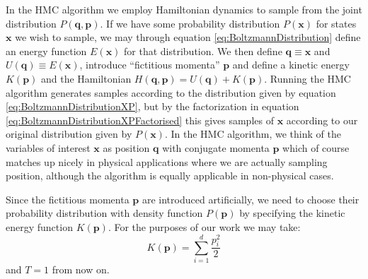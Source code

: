 \documentclass[12pt]{article}
\begin{document}
            In the HMC algorithm we employ Hamiltonian dynamics to sample from the joint distribution $P\left(\bm{q},\bm{p}\right)$. If we have some probability distribution $P\left(\bm{x}\right)$ for states $\bm{x}$ we wish to sample, we may through equation \ref{eq:BoltzmannDistribution} define an energy function $E\left(\bm{x}\right)$ for that distribution. We then define $\bm{q}\equiv\bm{x}$ and $U\left(\bm{q}\right) \equiv E\left(\bm{x}\right)$, introduce ``fictitious momenta'' $\bm{p}$ and define a kinetic energy $K\left(\bm{p}\right)$ and the Hamiltonian $H\left(\bm{q},\bm{p}\right) = U\left(\bm{q}\right) + K\left(\bm{p}\right)$. Running the HMC algorithm generates samples according to the distribution given by equation \ref{eq:BoltzmannDistributionXP}, but by the factorization in equation \ref{eq:BoltzmannDistributionXPFactorised} this gives samples of $\bm{x}$ according to our original distribution given by $P\left(\bm{x}\right)$. In the HMC algorithm, we think of the variables of interest $\bm{x}$ as position $\bm{q}$ with conjugate momenta $\bm{p}$ which of course matches up nicely in physical applications where we are actually sampling position, although the algorithm is equally applicable in non-physical cases.

            Since the fictitious momenta $\bm{p}$ are introduced artificially, we need to choose their probability distribution with density function $P\left(\bm{p}\right)$ by specifying the kinetic energy function $K\left(\bm{p}\right)$. For the purposes of our work we may take:
            \begin{equation}
                \label{eq:HMCQuadraticKineticEnergy}
                K\left(\bm{p}\right) = \sum_{i=1}^{d}\frac{p_i^2}{2}
            \end{equation}
            and $T=1$ from now on.
\end{document}
